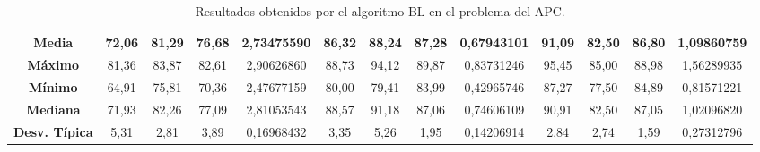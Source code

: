 \documentclass[11pt,a4paper]{article}
\begin{document}
\begin{table}[H]
{\begin{tabular}{c|c|c|c|c|c|c|c|c|c|c|c|c|}
\multicolumn{1}{|c|}{\textbf{Media}}        & 72,06                      & 81,29                   & 76,68                  & 2,73475590 & 86,32                      & 88,24                   & 87,28                  & 0,67943101 & 91,09                      & 82,50                   & 86,80                  & 1,09860759 \\ \hline
\multicolumn{1}{|c|}{\textbf{Máximo}}       & 81,36                      & 83,87                   & 82,61                  & 2,90626860 & 88,73                      & 94,12                   & 89,87                  & 0,83731246 & 95,45                      & 85,00                   & 88,98                  & 1,56289935 \\ \hline
\multicolumn{1}{|c|}{\textbf{Mínimo}}       & 64,91                      & 75,81                   & 70,36                  & 2,47677159 & 80,00                      & 79,41                   & 83,99                  & 0,42965746 & 87,27                      & 77,50                   & 84,89                  & 0,81571221 \\ \hline
\multicolumn{1}{|c|}{\textbf{Mediana}}      & 71,93                      & 82,26                   & 77,09                  & 2,81053543 & 88,57                      & 91,18                   & 87,06                  & 0,74606109 & 90,91                      & 82,50                   & 87,05                  & 1,02096820 \\ \hline
\multicolumn{1}{|c|}{\textbf{Desv. Típica}} & 5,31                       & 2,81                    & 3,89                   & 0,16968432 & 3,35                       & 5,26                    & 1,95                   & 0,14206914 & 2,84                       & 2,74                    & 1,59                   & 0,27312796 \\ \hline
\end{tabular}
}%
\caption{Resultados obtenidos por el algoritmo BL en el problema del APC.}
\end{table}
\end{document}
